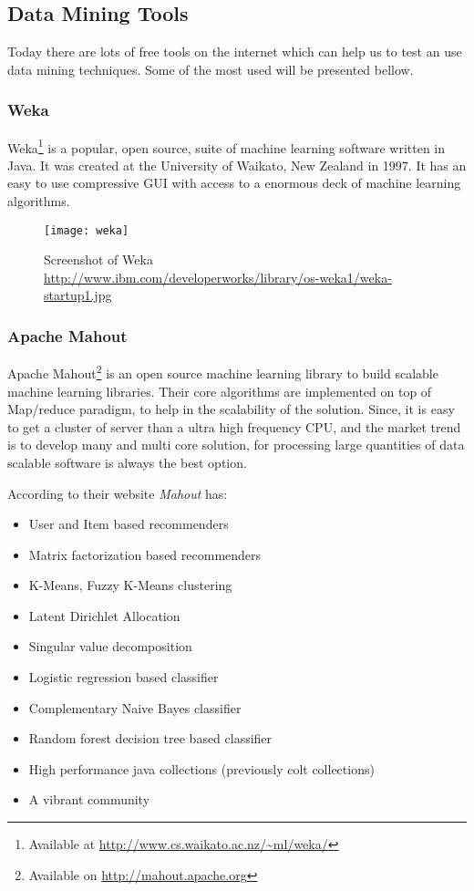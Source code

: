 \subsection{Data Mining Tools}
Today there are lots of free tools on the internet which can help us to test an use data mining techniques.
Some of the most used will be presented bellow.

\subsubsection{Weka}

Weka\footnote{Available at \url{http://www.cs.waikato.ac.nz/~ml/weka/}} is a popular, open source, suite of machine learning software written in Java.
It was created at the University of Waikato, New Zealand in 1997. It has an easy to use compressive GUI with access to a enormous deck of machine learning algorithms. 

\begin{figure}[h]
  \begin{center}
    \leavevmode
    \texttt{[image: weka]}
    \caption{Screenshot of Weka \url{http://www.ibm.com/developerworks/library/os-weka1/weka-startup1.jpg}}
    \label{fig:RapidMiner}
  \end{center}
\end{figure}


\subsubsection{Apache Mahout}

Apache Mahout\footnote{ Available on \url{http://mahout.apache.org}} is an open source machine learning library to build scalable machine learning libraries.
Their core algorithms are implemented on top of Map/reduce paradigm, to help in the scalability of the solution.
Since, it is easy to get a cluster of server than a ultra high frequency CPU, and the market trend is to develop many and multi core solution, for processing
large quantities of data scalable software is always the best option.

According to their website \emph{Mahout} has:
\begin{itemize}

\item User and Item based recommenders
\item Matrix factorization based recommenders
\item K-Means, Fuzzy K-Means clustering
\item Latent Dirichlet Allocation
\item Singular value decomposition
\item Logistic regression based classifier
\item Complementary Naive Bayes classifier
\item Random forest decision tree based classifier
\item High performance java collections (previously colt collections)
\item  A vibrant community

\end{itemize}

